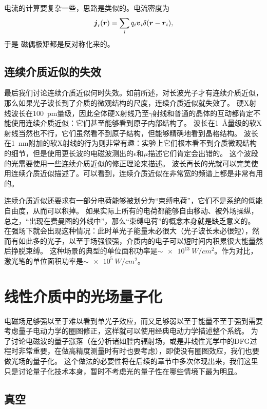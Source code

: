电流的计算要复杂一些，思路是类似的。电流密度为
\[
    \vb*{j}_\text{r}(\vb*{r}) = \sum_i q_i \vb*{v}_i \delta(\vb*{r} - \vb*{r}_i),
\]
于是
磁偶极矩都是反对称化来的。

\subsection{连续介质近似的失效}

最后我们讨论连续介质近似何时失效。如前所述，对长波光子才有连续介质近似，那么如果光子波长到了介质的微观结构的尺度，连续介质近似就失效了。
硬X射线波长在\SI{100}{pm}量级，因此全体硬X射线乃至$\gamma$射线和普通的晶体的互动都肯定不能使用连续介质近似：它们甚至能够看到原子内部结构了。
波长在\SI{1}{\angstrom}量级的软X射线当然也不行，它们虽然看不到原子结构，但能够精确地看到晶格结构。
波长在\SI{1}{nm}附加的软X射线的行为则非常有趣：实验上它们根本看不到介质微观结构的细节，但是使用更长波的电磁波测出的$\epsilon$和$\mu$描述它们肯定会出错的。
这个波段的光需要使用一些连续介质近似的修正理论来描述。
波长再长的光就可以完美使用连续介质近似描述了。可以看到，连续介质近似在非常宽的频谱上都是非常有用的。

连续介质近似还要求有一部分电荷能够被划分为“束缚电荷”，它们不是系统的低能自由度，从而可以积掉。
如果实际上所有的电荷都能够自由移动、被外场操纵，总之，“出现在费曼图的外线中”，那么“束缚电荷”的概念本身就是缺乏意义的。
在强场下就会出现这种情况：此时单光子能量未必很大（光子波长未必很短），然而有如此多的光子，以至于场强很强，介质内的电子可以短时间内积累很大能量然后挣脱束缚。
这种场景的典型的单位面积功率是$\sim\SI{e13}{W/cm^2}$。作为对比，激光笔的单位面积功率是$\sim \SI{e5}{W/cm^2}$。

\section{线性介质中的光场量子化}

电磁场足够强以至于难以看到单光子效应，而又足够弱以至于能量不至于强到需要考虑量子电动力学的圈图修正，这样就可以使用经典电动力学描述整个系统。
为了讨论电磁波的量子涨落（在分析诸如腔内辐射场，或是非线性光学中的DFG过程时非常重要，在做高精度测量时有时也要考虑），即使没有圈图效应，我们也要做光场的量子化。
这个做法的必要性将在后续的章节中多次体现出来，我们这里只是讨论量子化技术本身，暂时不考虑光的量子性在哪些情境下最为明显。

\subsection{真空}\label{sec:quantization-in-vacuum}

